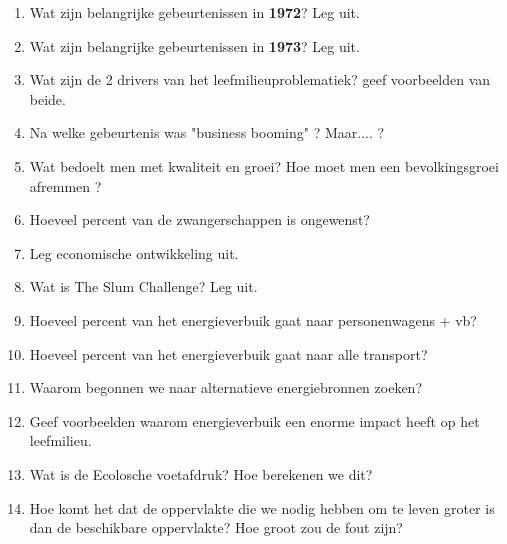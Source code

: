 \documentclass[a4paper,12pt]{article}
\begin{document}
\begin{enumerate}
        \item Wat zijn belangrijke gebeurtenissen in \textbf{1972}? Leg uit.
        \item Wat zijn belangrijke gebeurtenissen in \textbf{1973}? Leg uit.
        \item Wat zijn de 2 drivers van het leefmilieuproblematiek? geef voorbeelden van beide.
        \item Na welke gebeurtenis was "business booming" ? Maar.... ?
        \item Wat bedoelt men met kwaliteit en groei? Hoe moet men een bevolkingsgroei afremmen ?
        \item Hoeveel percent van de zwangerschappen is ongewenst?
        \item Leg economische ontwikkeling uit. 
        \item Wat is The Slum Challenge? Leg uit.
        \item Hoeveel percent van het energieverbuik gaat naar personenwagens + vb?
        \item Hoeveel percent van het energieverbuik gaat naar alle transport?
        \item Waarom begonnen we naar alternatieve energiebronnen zoeken?
        \item Geef voorbeelden waarom energieverbuik een enorme impact heeft op het leefmilieu.
        \item Wat is de Ecolosche voetafdruk? Hoe berekenen we dit?
        \item Hoe komt het dat de oppervlakte die we nodig hebben om te leven groter is dan de beschikbare oppervlakte? Hoe groot zou de fout zijn?
    \end{enumerate}
    
\end{document}
